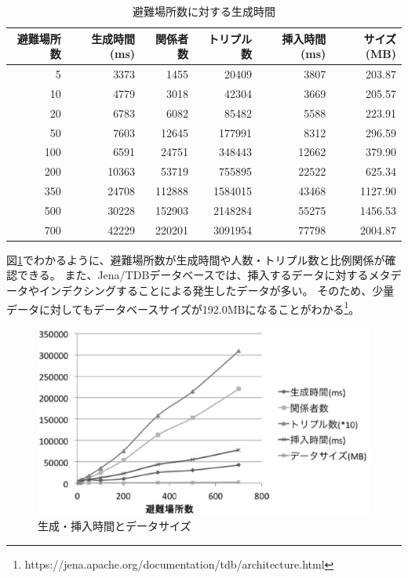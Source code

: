 \begin{table}[h!]
	\begin{center}
	\begin{tabular}{| r | r | r | r | r | r |}
		\hline
		\rowstyle{\bfseries}
		避難場所数 & 生成時間(ms) & 関係者数 & トリプル数 & 挿入時間(ms) & サイズ(MB) \\
		\hline
		5 & 3373 & 1455 & 20409 & 3807 & 203.87 \\
		\hline
		10 & 4779 & 3018 & 42304 & 3669 & 205.57 \\
		\hline
		20 & 6783 & 6082 & 85482 & 5588 & 223.91 \\
		\hline
		50 & 7603 & 12645 & 177991 & 8312 & 296.59 \\
		\hline
		100 & 6591 & 24751 & 348443 & 12662 & 379.90 \\
		\hline
		200 & 10363 & 53719 & 755895 & 22522 & 625.34 \\
		\hline
		350 & 24708 & 112888 & 1584015 & 43468 & 1127.90 \\
		\hline
		500 & 30228 & 152903 & 2148284 & 55275 & 1456.53 \\
		\hline
		700 & 42229 & 220201 & 3091954 & 77798 & 2004.87 \\
		\hline
	\end{tabular}
	\caption{避難場所数に対する生成時間}
	\label{table:sibm_time_table}
	\end{center}
\end{table}

図\ref{fig:sibm_data_time}でわかるように、避難場所数が生成時間や人数・トリプル数と比例関係が確認できる。
また、Jena/TDBデータベースでは、挿入するデータに対するメタデータやインデクシングすることによる発生したデータが多い。
そのため、少量データに対してもデータベースサイズが192.0MBになることがわかる\footnote{https://jena.apache.org/documentation/tdb/architecture.html}。

\begin{figure}[t!]
 	\begin{center}
 		\includegraphics[width=120mm]{./images/test_chart1.eps}
 		\caption{生成・挿入時間とデータサイズ}
 		\label{fig:sibm_data_time}
 	\end{center}
\end{figure}

